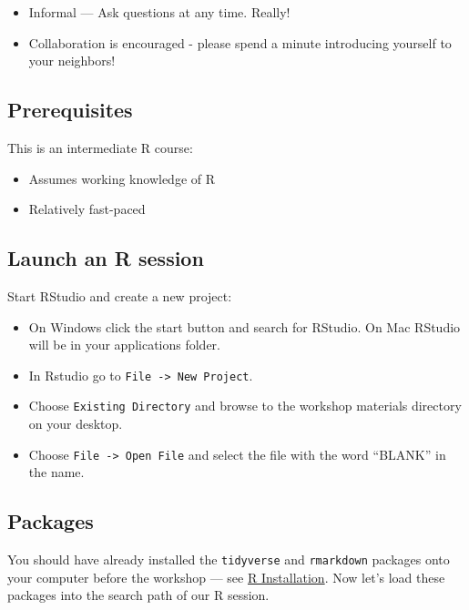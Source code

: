 \documentclass[
]{book}
\providecommand{\tightlist}{%
  \setlength{\itemsep}{0pt}\setlength{\parskip}{0pt}}
\begin{document}
\begin{itemize}
\tightlist
\item
  Informal --- Ask questions at any time. Really!
\item
  Collaboration is encouraged - please spend a minute introducing yourself to your neighbors!
\end{itemize}

\hypertarget{prerequisites-2}{%
\subsection{Prerequisites}\label{prerequisites-2}}

This is an intermediate R course:

\begin{itemize}
\tightlist
\item
  Assumes working knowledge of R
\item
  Relatively fast-paced
\end{itemize}

\hypertarget{launch-an-r-session-1}{%
\subsection{Launch an R session}\label{launch-an-r-session-1}}

Start RStudio and create a new project:

\begin{itemize}
\tightlist
\item
  On Windows click the start button and search for RStudio. On Mac
  RStudio will be in your applications folder.
\item
  In Rstudio go to \texttt{File\ -\textgreater{}\ New\ Project}.
\item
  Choose \texttt{Existing\ Directory} and browse to the workshop materials directory on your desktop.
\item
  Choose \texttt{File\ -\textgreater{}\ Open\ File} and select the file with the word ``BLANK'' in the name.
\end{itemize}

\hypertarget{packages-1}{%
\subsection{Packages}\label{packages-1}}

You should have already installed the \texttt{tidyverse} and \texttt{rmarkdown}
packages onto your computer before the workshop
--- see \href{./Rinstall.html}{R Installation}.
Now let's load these packages into the search path of our R session.
\end{document}
